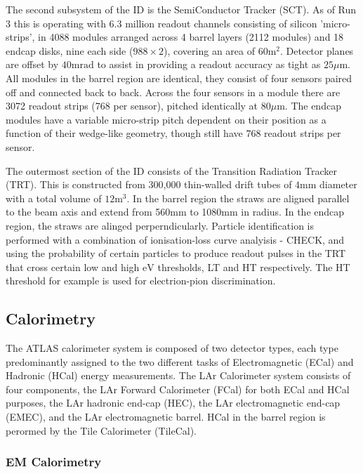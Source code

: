 The second subsystem of the ID is the SemiConductor Tracker (SCT). As of Run 3 this is operating with 6.3 million readout channels consisting of silicon 'micro-strips', in 4088 modules arranged across 4 barrel layers (2112 modules) and 18 endcap disks, nine each side ($988\times 2$), covering an area of $60\text{m}^{2}$. Detector planes are offset by $40\text{mrad}$ to assist in providing a readout accuracy as tight as $25\mu\text{m}$. All modules in the barrel region are identical, they consist of four sensors paired off and connected back to back. Across the four sensors in a module there are 3072 readout strips (768 per sensor), pitched identically at $80\mu\text{m}$. The endcap modules have a variable micro-strip pitch dependent on their position as a function of their wedge-like geometry, though still have 768 readout strips per sensor.

The outermost section of the ID consists of the Transition Radiation Tracker (TRT). This is constructed from 300,000 thin-walled drift tubes of $4\text{mm}$ diameter with a total volume of $12\text{m}^{3}$. In the barrel region the straws are aligned parallel to the beam axis and extend from 560mm to 1080mm in radius. In the endcap region, the straws are alinged perperndicularly. Particle identification is performed with a combination of ionisation-loss curve analyisis - CHECK, and using the probability of certain particles to produce readout pulses in the TRT that cross certain low and high $\text{eV}$ thresholds, LT and HT respectively. The HT threshold for example is used for electrion-pion discrimination. 

\subsection{Calorimetry}
The ATLAS calorimeter system is composed of two detector types, each type predominantly assigned to the two different tasks of Electromagnetic (ECal) and Hadronic (HCal) energy measurements. The LAr Calorimeter system consists of four components, the LAr Forward Calorimeter (FCal) for both ECal and HCal purposes, the LAr hadronic end-cap (HEC), the LAr electromagnetic end-cap (EMEC), and the LAr electromagnetic barrel. HCal in the barrel region is perormed by the Tile Calorimeter (TileCal).

\subsubsection{EM Calorimetry}


